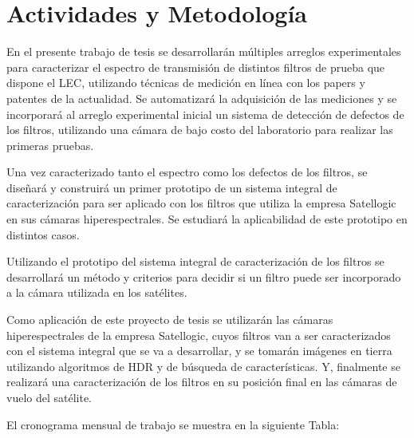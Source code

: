 \documentclass{ctuthesis}
\begin{document}
\section*{Actividades y Metodología}

\hspace{0.5cm}En el presente trabajo de tesis se desarrollarán múltiples 
arreglos 
experimentales para caracterizar el espectro de transmisión de distintos 
filtros de prueba que dispone el LEC, utilizando técnicas de medición en línea 
con los papers y patentes de la actualidad. Se automatizará la adquisición de 
las mediciones y se incorporará al arreglo experimental inicial un sistema de 
detección de defectos de los filtros, utilizando una cámara de bajo costo del 
laboratorio para realizar las primeras pruebas. 

Una vez caracterizado tanto el espectro como los defectos de los filtros, se 
diseñará y construirá un primer prototipo de un sistema integral de 
caracterización para ser aplicado con los filtros que utiliza la empresa 
Satellogic en sus cámaras hiperespectrales. Se estudiará la aplicabilidad de 
este prototipo en distintos casos.

Utilizando el prototipo del sistema integral de caracterización de los filtros 
se desarrollará un método y criterios para decidir si un filtro puede ser 
incorporado a la cámara utilizada en los satélites.

Como aplicación de este proyecto de tesis se utilizarán las cámaras 
hiperespectrales de la empresa Satellogic, cuyos filtros van a ser 
caracterizados con el sistema integral que se va a desarrollar, y se tomarán 
imágenes en tierra utilizando algoritmos de HDR y de búsqueda de 
características.  Y, finalmente se realizará una caracterización de los filtros 
en su posición final en las cámaras de vuelo del satélite.

El cronograma mensual de trabajo se muestra en la siguiente Tabla:
\end{document}
